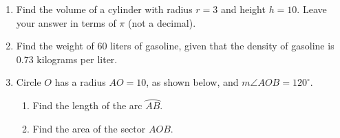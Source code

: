 \documentclass[12pt, twoside]{article}
\begin{document}
\begin{enumerate}
\newpage

   \item Find the volume of a cylinder with radius $r=3$ and height $h=10$. Leave your answer in terms of $\pi$ (not a decimal). \vspace{2.5cm}
   \item Find the weight of $60$ liters of gasoline, given that the density of gasoline is $0.73$ kilograms per liter. \vspace{3.0cm}

   \item Circle $O$ has a radius $AO=10$, as shown below, and $m\angle AOB=120^\circ$.
         \begin{center}
       \end{center}
       \begin{enumerate}
         \item Find the length of the arc $\wideparen{AB}$. \vspace{3.5cm}
         \item Find the area of the sector $AOB$. %
       \end{enumerate}

  \end{enumerate}
  \newpage
  \setcounter{page}{1}
\end{document}
